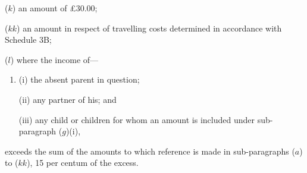 \documentclass[12pt,a4paper]{article}
\begin{document}
\begin{enumerate}
($k$) an amount of 
£30.00; %

($kk$) an amount in respect of travelling costs determined in accordance with Schedule 3B;

($l$) where the income of—
\begin{enumerate}\item[]
(i) the absent parent in question;

(ii) any partner of his; and

(iii) any child or children for whom an amount is included under sub-paragraph ($g$)(i),
\end{enumerate}
exceeds the sum of the amounts to which reference is made in sub-paragraphs 
($a$) to ($kk$),  %
15 per centum %
of the excess.
\end{enumerate}
\end{document}
